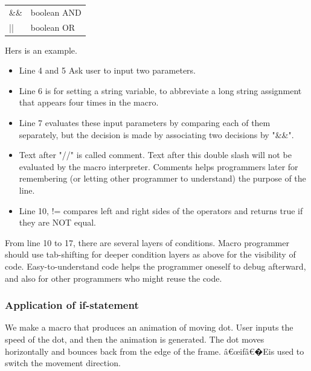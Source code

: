 \documentclass[11pt,a4paper,oneside]{report}
\newenvironment{indentCom}%
{\begin{list}{}%
         {\setlength{\leftmargin}{1em}}%
         \item[]%
}
{\end{list}}
\begin{document}
\begin{indentCom}
 \begin{tabular*}{0.5\textwidth}{ l l }
\&\& & boolean AND\\
|| & boolean OR\\
\end{tabular*}
\end{indentCom}
Hers is an example.

\begin{itemize}
\item Line 4 and 5 Ask user to input two parameters.
\item Line 6 is for setting a string variable, to abbreviate a long string assignment that appears four times in the macro.
\item Line 7 evaluates these input parameters by comparing each of them separately, but the decision is made by associating two decisions by "\&\&". 
\item Text after "//" is called comment. Text after this double slash will not be evaluated by the macro interpreter. Comments helps programmers later for remembering (or letting other programmer to understand) the purpose of the line. 
\item Line 10, != compares left and right sides of the operators and returns true if they are NOT equal.   
\end{itemize}
From line 10 to 17, there are several layers of conditions. Macro programmer should use tab-shifting for deeper condition layers as above for the visibility of code. Easy-to-understand code helps the programmer oneself to debug afterward, and also for other programmers who might reuse the code.
\subsubsection{Application of if-statement}
\label{sec:dotmove}
We make a macro that produces an animation of moving dot. User inputs the speed of the dot, and then the animation is generated. The dot moves horizontally and bounces back from the edge of the frame. â€œifâ€�Eis used to switch the movement direction. 

\end{document}
